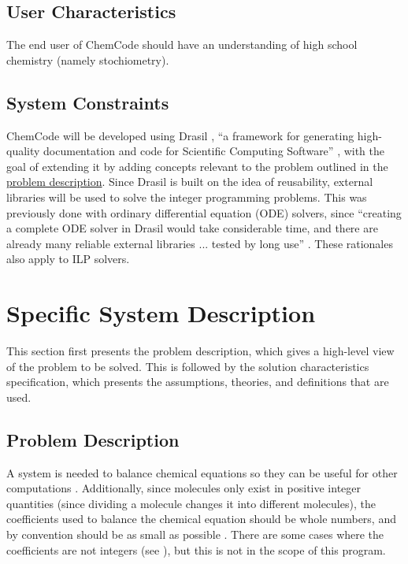 \documentclass[12pt]{article}
\begin{document}
\subsection{User Characteristics}
\label{Sec:UserChars}
The end user of ChemCode should have an understanding of high school chemistry (namely stochiometry).

\subsection{System Constraints}
\label{Sec:SysConstraints}
ChemCode will be developed using Drasil \cite{drasilSource}, ``a framework for generating high-quality documentation and code for Scientific Computing Software'' \cite{maclachlan2021}, with the goal of extending it by adding concepts relevant to the problem outlined in the \hyperref[Sec:ProbDesc]{problem description}. Since Drasil is built on the idea of reusability, external libraries will be used to solve the integer programming problems. This was previously done with ordinary differential equation (ODE) solvers, since ``creating a complete ODE solver in Drasil would take considerable time, and there are already many reliable external libraries ... tested by long use'' \cite[(pg. 24)]{chen2022}. These rationales also apply to ILP solvers.

\section{Specific System Description}
\label{Sec:SpecSystDesc}
This section first presents the problem description, which gives a high-level view of the problem to be solved. This is followed by the solution characteristics specification, which presents the assumptions, theories, and definitions that are used.

\subsection{Problem Description}
\label{Sec:ProbDesc}
A system is needed to balance chemical equations so they can be useful for other computations \cite{lund2023}. Additionally, since molecules only exist in positive integer quantities (since dividing a molecule changes it into different molecules), the coefficients used to balance the chemical equation should be whole numbers, and by convention should be as small as possible \cite{lund2023}. There are some cases where the coefficients are not integers (see \cite{nonIntCoeffSource}), but this is not in the scope of this program.
\end{document}
